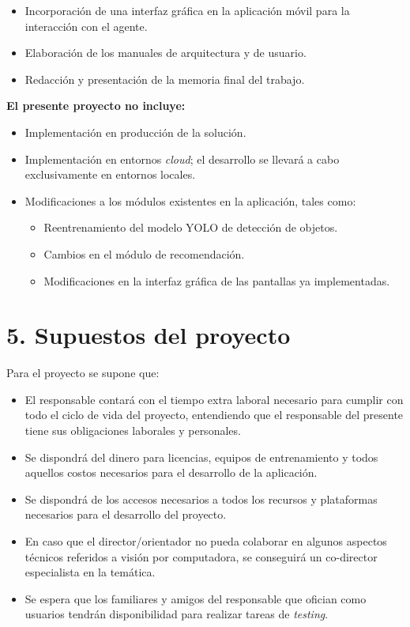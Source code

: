 \documentclass[
11pt, %
]{charter}
\begin{document}
\begin{itemize}
\begin{itemize}
\begin{itemize}
        \end{itemize}
    \end{itemize}
    \item Incorporación de una interfaz gráfica en la aplicación móvil para la interacción con el agente.
    \item Elaboración de los manuales de arquitectura y de usuario.
    \item Redacción y presentación de la memoria final del trabajo.
\end{itemize}

\textbf{El presente proyecto no incluye:}
\begin{itemize}
    \item Implementación en producción de la solución.
    \item Implementación en entornos \textit{cloud}; el desarrollo se llevará a cabo exclusivamente en entornos locales.
    \item Modificaciones a los módulos existentes en la aplicación, tales como:
    \begin{itemize}
        \item Reentrenamiento del modelo YOLO de detección de objetos.
        \item Cambios en el módulo de recomendación.
        \item Modificaciones en la interfaz gráfica de las pantallas ya implementadas.
    \end{itemize}
\end{itemize}

\section{5. Supuestos del proyecto}
\label{sec:supuestos}
Para el proyecto se supone que:
\begin{itemize}
	\item El responsable contará con el tiempo extra laboral necesario para cumplir con todo el ciclo de vida del proyecto, entendiendo que el responsable del presente tiene sus obligaciones laborales y personales.
	\item Se dispondrá del dinero para licencias, equipos de entrenamiento y todos aquellos costos necesarios para el desarrollo de la aplicación.
	\item Se dispondrá de los accesos necesarios a todos los recursos y plataformas necesarios para el desarrollo del proyecto.
	\item En caso que el director/orientador no pueda colaborar en algunos aspectos técnicos referidos a visión por computadora, se conseguirá un co-director especialista en la temática.
	\item Se espera que los familiares y amigos del responsable que ofician como usuarios tendrán disponibilidad para realizar tareas de \textit{testing}.
\end{itemize}
\end{document}
